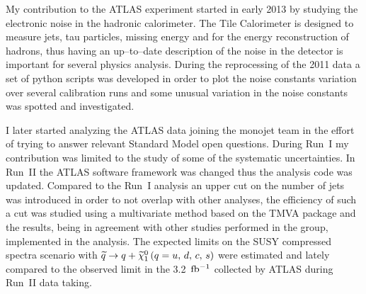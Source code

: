 My contribution to the ATLAS experiment started in early 2013 by studying the
electronic noise in the hadronic calorimeter. The Tile Calorimeter is designed
to measure jets, tau particles, missing energy and for the energy reconstruction
of hadrons, thus having an up--to--date description of the noise in the detector
is important for several physics analysis. During the reprocessing of the 2011
data a set of python scripts was developed in order to plot the noise constants
variation over several calibration runs and some unusual variation in the noise
constants was spotted and investigated.

\mbox{}

I later started analyzing the ATLAS data joining the monojet team in the effort
of trying to answer relevant Standard Model open questions. During Run~I my
contribution was limited to the study of some of the systematic
uncertainties. In Run~II the ATLAS software framework was changed thus the
analysis code was updated. Compared to the Run~I analysis an upper cut on the
number of jets was introduced in order to not overlap with other analyses, the
efficiency of such a cut was studied using a multivariate method based on the
TMVA package and the results, being in agreement with other studies performed in
the group, implemented in the analysis. The expected limits on the SUSY
compressed spectra scenario with $\widetilde{q} \rightarrow q + \widetilde{\chi}_1^0\, (q = u,\, d,\, c,\, s)$ were estimated and lately
compared to the observed limit in the 3.2~$\mbox{fb$^{-1}$}$ collected by ATLAS during
Run~II data taking.
